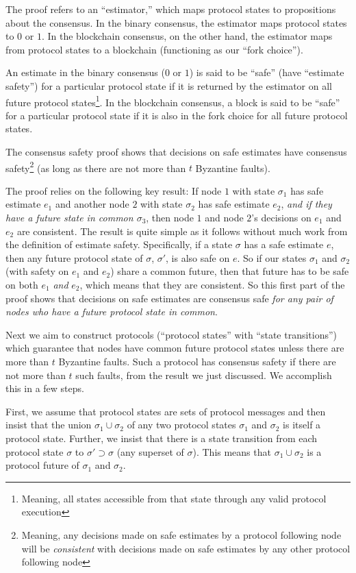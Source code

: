\documentclass{article}
\theoremstyle{definition}
\begin{document}
The proof refers to an ``estimator,'' which maps protocol states to propositions about the consensus. In the binary consensus, the estimator maps protocol states to $0$ or $1$. In the blockchain consensus, on the other hand, the estimator maps from protocol states to a blockchain (functioning as our ``fork choice'').

An estimate in the binary consensus ($0$ or $1$) is said to be ``safe'' (have ``estimate safety'') for a particular protocol state if it is returned by the estimator on all future protocol states\footnote{Meaning, all states accessible from that state through any valid protocol execution}. In the blockchain consensus, a block is said to be ``safe'' for a particular protocol state if it is also in the fork choice for all future protocol states.

The consensus safety proof shows that decisions on safe estimates have consensus safety\footnote{Meaning, any decisions made on safe estimates by a protocol following node will be \emph{consistent} with decisions made on safe estimates by any other protocol following node} (as long as there are not more than $t$ Byzantine faults).

The proof relies on the following key result: If node $1$ with state $\sigma_1$ has safe estimate $e_1$ and another node $2$ with state $\sigma_2$ has safe estimate $e_2$, \emph{and if they have a future state in common $\sigma_3$}, then node $1$ and node $2$'s decisions on $e_1$ and $e_2$ are consistent. The result is quite simple as it follows without much work from the definition of estimate safety. Specifically, if a state $\sigma$ has a safe estimate $e$, then any future protocol state of $\sigma$, $\sigma'$, is also safe on $e$. So if our states $\sigma_1$ and $\sigma_2$ (with safety on $e_1$ and $e_2$) share a common future, then that future has to be safe on both $e_1$ \emph{and} $e_2$, which means that they are consistent. So this first part of the proof shows that decisions on safe estimates are consensus safe \emph{for any pair of nodes who have a future protocol state in common}.

Next we aim to construct protocols (``protocol states'' with ``state transitions'') which guarantee that nodes have common future protocol states unless there are more than $t$ Byzantine faults. Such a protocol has consensus safety if there are not more than $t$ such faults, from the result we just discussed. We accomplish this in a few steps.

First, we assume that protocol states are sets of protocol messages and then insist that the union $\sigma_1 \cup \sigma_2$ of any two protocol states $\sigma_1$ and $\sigma_2$ is itself a protocol state. Further, we insist that there is a state transition from each protocol state $\sigma$ to $\sigma' \supset \sigma$ (any superset of $\sigma$). This means that $\sigma_1 \cup \sigma_2$ is a protocol future of $\sigma_1$ and $\sigma_2$.
\end{document}
